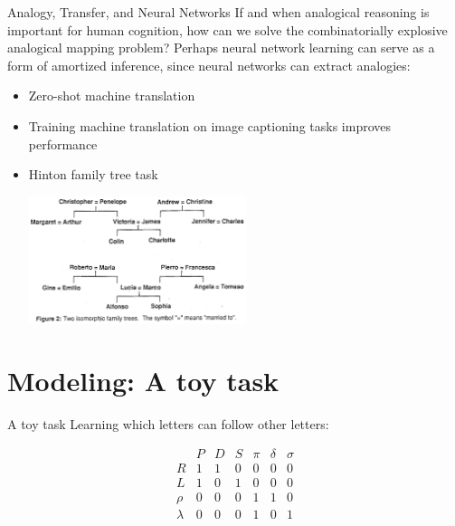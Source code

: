 \documentclass{beamer}
\begin{document}
\begin{frame}{Analogy, Transfer, and Neural Networks}
If and when analogical reasoning is important for human cognition, how can we solve the combinatorially explosive analogical mapping problem? Perhaps neural network learning can serve as a form of amortized inference, since neural networks can extract analogies: 
\begin{itemize}
    \item<2-> Zero-shot machine translation \cite{Johnson2016}
    \item<3-> Training machine translation on image captioning tasks improves performance \cite{Luong2016} 
    \item<4-> Hinton family tree task \cite{Hinton1986}
    \begin{center}
	\includegraphics[width = 0.5\textwidth]{../writing/cogsci_2017/figures/hinton_family_tree_figure.png}
    \end{center}
\end{itemize}
\end{frame}

\section{Modeling: A toy task}
\begin{frame}{A toy task}
Learning which letters can follow other letters:\vspace{-2em}
\begin{center}
\[
\begin{array}{c|cccccc} 
& P & D & S & \pi & \delta & \sigma \\
\hline
R & 1 & 1 & 0 & 0 & 0 & 0 \\
L & 1 & 0 & 1 & 0 & 0 & 0 \\
\rho & 0 & 0 & 0 & 1 & 1 & 0\\
\lambda & 0 & 0 & 0 & 1 & 0 & 1\\
\end{array} 
\]
\end{center}
\end{frame}
\end{document}
